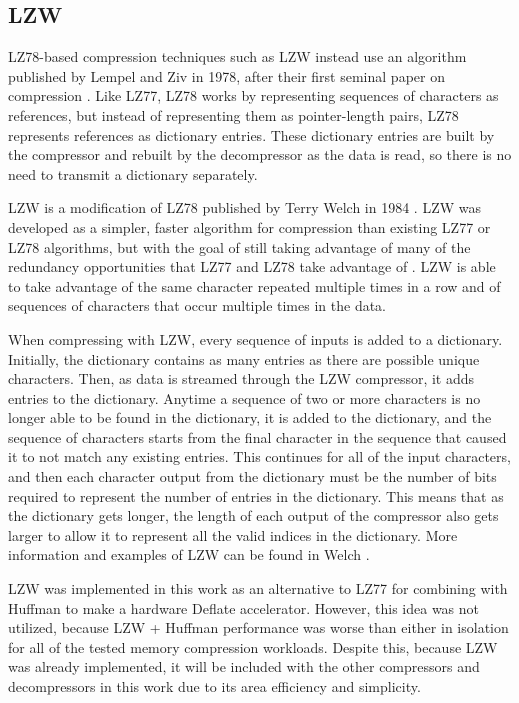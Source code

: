 \documentclass[doublespace,nopageskip]{VTthesis}
\begin{document}
\subsection{LZW}\label{ss:lzw}
LZ78-based compression techniques such as LZW instead use an algorithm published by Lempel and Ziv in 1978, after their first seminal paper on compression \cite{lz78}. Like LZ77, LZ78 works by representing sequences of characters as references, but instead of representing them as pointer-length pairs, LZ78 represents references as dictionary entries. These dictionary entries are built by the compressor and rebuilt by the decompressor as the data is read, so there is no need to transmit a dictionary separately.

LZW is a modification of LZ78 published by Terry Welch in 1984 \cite{lzw}. LZW was developed as a simpler, faster algorithm for compression than existing LZ77 or LZ78 algorithms, but with the goal of still taking advantage of many of the redundancy opportunities that LZ77 and LZ78 take advantage of \cite{lzw}. LZW is able to take advantage of the same character repeated multiple times in a row and of sequences of characters that occur multiple times in the data.

When compressing with LZW, every sequence of inputs is added to a dictionary. Initially, the dictionary contains as many entries as there are possible unique characters. Then, as data is streamed through the LZW compressor, it adds entries to the dictionary. Anytime a sequence of two or more characters is no longer able to be found in the dictionary, it is added to the dictionary, and the sequence of characters starts from the final character in the sequence that caused it to not match any existing entries. This continues for all of the input characters, and then each character output from the dictionary must be the number of bits required to represent the number of entries in the dictionary. This means that as the dictionary gets longer, the length of each output of the compressor also gets larger to allow it to represent all the valid indices in the dictionary. More information and examples of LZW can be found in Welch \cite{lzw}.

LZW was implemented in this work as an alternative to LZ77 for combining with Huffman to make a hardware Deflate accelerator. However, this idea was not utilized, because LZW + Huffman performance was worse than either in isolation for all of the tested memory compression workloads. Despite this, because LZW was already implemented, it will be included with the other compressors and decompressors in this work due to its area efficiency and simplicity.
\end{document}
